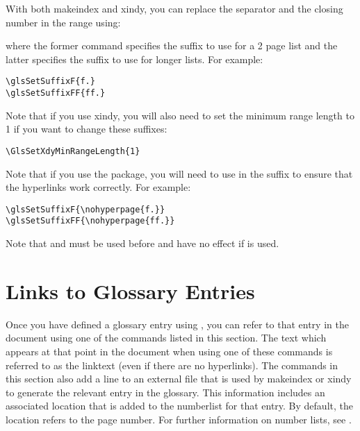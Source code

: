 \documentclass{nlctdoc}
\begin{document}
With both \gls{makeindex} and \gls{xindy}, you can replace
the separator and the closing number in the range using:
\begin{definition}[\DescribeMacro{\glsSetSuffixF}]
\end{definition}
\begin{definition}[\DescribeMacro{\glsSetSuffixFF}]
\end{definition}
where the former command specifies the suffix to use for a 2 page
list and the latter specifies the suffix to use for longer lists.
For example:
\begin{verbatim}
\glsSetSuffixF{f.}
\glsSetSuffixFF{ff.}
\end{verbatim}
Note that if you use \gls{xindy}, you will also need to
set the minimum range length to 1 if you want to change these
suffixes:
\begin{verbatim}
\GlsSetXdyMinRangeLength{1}
\end{verbatim}
Note that if you use the  package, you will need
to use  in the suffix to ensure that the hyperlinks
work correctly. For example:
\begin{verbatim}
\glsSetSuffixF{\nohyperpage{f.}}
\glsSetSuffixFF{\nohyperpage{ff.}}
\end{verbatim}

\begin{important}
Note that  and  must be used 
before  and have no effect if  is 
used.
\end{important}


\section{Links to Glossary Entries}
\label{sec:glslink}

Once you have defined a glossary entry using ,
you can refer to that entry in the document using one of the
commands listed in this section. The text which appears at that
point in the document when using one of these commands is referred
to as the \gls{linktext} (even if there are no hyperlinks). The
commands in this section also add a line to an external file that is
used by \gls{makeindex} or \gls{xindy} to generate the relevant
entry in the glossary. This information includes an associated
location that is added to the \gls{numberlist} for that entry. By
default, the location refers to the page number. For further
information on number lists, see .
\end{document}
